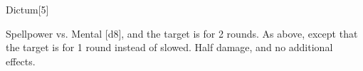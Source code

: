 \begin{spellsection}{Dictum}[5]
    \begin{spellheader}
    \end{spellheader}
    \begin{spellcontent}
        \begin{spelltargetinginfo}
        \end{spelltargetinginfo}
        \begin{spelleffects}
            \begin{spellattack}{Spellpower vs. Mental}
                \spellsuccess {}[d8], and the target is \immobilized for 2 rounds.
                \spellcritical As above, except that the target is \stunned for 1 round instead of slowed.
                \spellfailure Half damage, and no additional effects.
            \end{spellattack}
        \end{spelleffects}
    \end{spellcontent}
    \begin{spellfooter}
        \miscastexplode
    \end{spellfooter}
    \begin{spellaugments}
    \end{spellaugments}
\end{spellsection}

